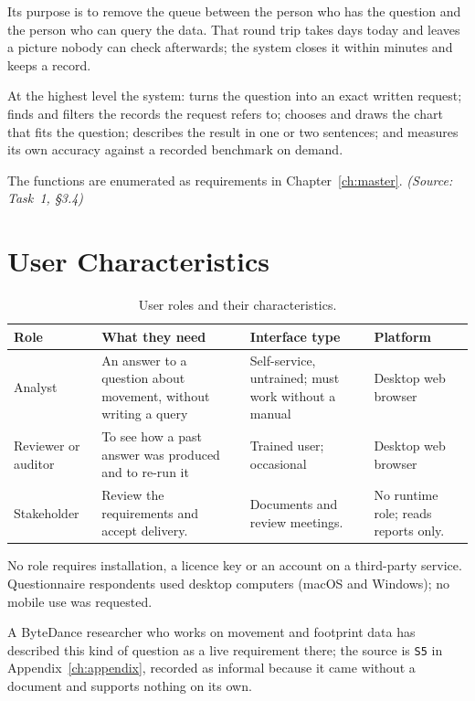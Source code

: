 \documentclass[12pt,a4paper]{report}
\newcommand{\src}[1]{{\small\itshape (Source: #1)}}
\begin{document}
Its purpose is to remove the queue between the person who has the question
and the person who can query the data. That round trip takes days today and
leaves a picture nobody can check afterwards; the system closes it within
minutes and keeps a record.

At the highest level the system: turns the question into an exact written
request; finds and filters the records the request refers to; chooses and
draws the chart that fits the question; describes the result in one or two
sentences; and measures its own accuracy against a recorded benchmark on
demand.

The functions are enumerated as requirements in
Chapter~\ref{ch:master}. \src{Task~1, \S3.4}

\section{User Characteristics}
\label{sec:user-characteristics}

\begin{table}[H]
  \centering
  \caption{User roles and their characteristics.}
  \label{tab:users}
  \begin{tabular}{@{}p{2.5cm} p{4.3cm} p{2.9cm} p{4.6cm}@{}}
    \toprule[1.5pt]
    \textbf{Role} & \textbf{What they need} & \textbf{Interface type} &
      \textbf{Platform} \\
    \midrule
    Analyst & An answer to a question about movement, without writing a
      query & Self-service, untrained; must work without a manual &
      Desktop web browser \\
    \addlinespace
    Reviewer or auditor & To see how a past answer was produced and to
      re-run it & Trained user; occasional & Desktop web browser \\
    \addlinespace
    Stakeholder & Review the requirements and accept delivery. &
      Documents and review meetings. &
      No runtime role; reads reports only. \\
    \bottomrule[1.5pt]
  \end{tabular}
\end{table}

No role requires installation, a licence key or an account on a third-party
service. Questionnaire respondents used desktop computers (macOS and
Windows); no mobile use was requested.

A ByteDance researcher who works on movement and footprint data has described
this kind of question as a live requirement there; the source is \texttt{S5}
in Appendix~\ref{ch:appendix}, recorded as informal because it came without a
document and supports nothing on its own.
\end{document}
